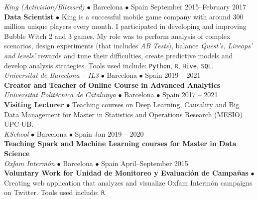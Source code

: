 \documentclass[a4paper, oneside]{scrreprt}
\begin{document}
\vspace{-0.3cm}
\noindent{}
\hspace{-0.15cm}\textit{King (Activision/Blizzard)} $\bullet$ 
Barcelona $\bullet$ Spain \hfill September 2015--February 2017\\
\noindent\textbf{\small Data Scientist } $\bullet$ 
{\small King is a successful mobile game company with around 300 million unique players every month. I participated in developing and
  improving Bubble Witch 2 and 3 games. My
  role was to perform analysis of complex scenarios,
  design experiments (that includes \textit{AB Tests}),
  balance \textit{Quest's, Liveops' and levels'}
  rewards and tune their difficulties,
  create predictive models and develop analysis strategies.
  Tools used include: \texttt{Python}, \texttt{R}, \texttt{Hive}, \texttt{SQL}. }\\

\vspace{-0.3cm}
\noindent{}\textit{Universitat de Barcelona -- IL3} $\bullet$ 
Barcelona $\bullet$ Spain \hfill 2019 -- 2021\\
\noindent\textbf{\small Creator and Teacher of Online Course in Advanced Analytics} \\

\vspace{-0.3cm}
\noindent{}\textit{Universitat Politècnica de Catalunya} $\bullet$ 
Barcelona $\bullet$ Spain \hfill 2017 -- 2021\\
\noindent\textbf{\small Visiting Lecturer} $\bullet$ Teaching courses on Deep Learning, Causality and
Big Data Management for Master in Statistics and Operations Research (MESIO) UPC-UB. \\

\vspace{-0.3cm}
\noindent{}\textit{KSchool} $\bullet$ 
Barcelona $\bullet$ Spain \hfill Jan 2019 -- 2020\\
\noindent\textbf{\small Teaching Spark and Machine Learning courses for Master in Data Science} \\

\vspace{-0.3cm}
\noindent{}\textit{Oxfam Intermón} $\bullet$ 
Barcelona $\bullet$ Spain \hfill April--September 2015\\
\noindent\textbf{\small Voluntary Work for Unidad de Monitoreo y Evaluación de Campañas} $\bullet$ 
{\small Creating web application that analyzes and visualize Oxfam Intermón
  campaigns on Twitter.  Tools used
  include: \texttt{R}}\\
\end{document}
